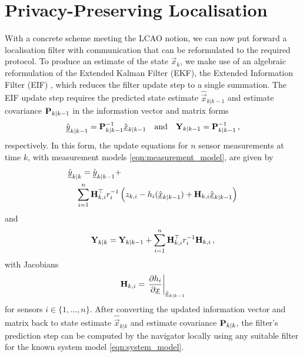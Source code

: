 \documentclass[10pt,letterpaper,oneside,twocolumn,journal]{IEEEtran}
\theoremstyle{definition}
\theoremstyle{definition}
\theoremstyle{remark}
\begin{document}
\section{Privacy-Preserving Localisation} \label{sec:priv_localisation}
With a concrete scheme meeting the LCAO notion, we can now put forward a localisation filter with communication that can be reformulated to the required protocol. To produce an estimate of the state $\vec{x}_k$, we make use of an algebraic reformulation of the Extended Kalman Filter (EKF), the Extended Information Filter (EIF) \cite{maybeckStochasticModelsEstimation1982}, which reduces the filter update step to a single summation. The EIF update step requires the predicted state estimate $\hat{\vec{x}}_{k|k-1}$ and estimate covariance ${{\mathbf{P}}}_{k|k-1}$ in the information vector and matrix forms
\begin{equation}
    \hat{{\underline{y}}}_{k|k-1} = {{\mathbf{P}}}_{k|k-1}^{-1}\hat{{\underline{x}}}_{k|k-1} \quad\textrm{and}\quad {\ensuremath{{\mathbf{Y}}}}_{k|k-1} = {{\mathbf{P}}}_{k|k-1}^{-1}\,,
\end{equation}
respectively. In this form, the update equations for $n$ sensor measurements at time $k$, with measurement models \eqref{eqn:measurement_model}, are given by
\begin{equation}
    \begin{split}
        &\hat{\vec{y}}_{k|k} = \hat{\vec{y}}_{k|k-1} + \\
        &\quad \sum^n_{i=1}\mat{H}^\top_{k,i} r^{-1}_i \left(z_{k,i} - h_i(\hat{\vec{x}}_{k|k-1}) + \mat{H}_{k,i}\hat{\vec{x}}_{k|k-1}\right)
    \end{split} \label{eqn:eif_info_vec_update}
\end{equation}
and
\begin{equation}
    \mat{Y}_{k|k} = \mat{Y}_{k|k-1} + \sum^n_{i=1}\mat{H}^\top_{k,i} r^{-1}_i \mat{H}_{k,i}\,, \label{eqn:eif_info_mat_update}
\end{equation}
with Jacobians
\begin{equation}
    \mat{H}_{k,i} = \left.\frac{\partial h_i}{\partial \vec{x}}\right|_{\hat{\vec{x}}_{k|k-1}} \label{eqn:measurement_jacobian}
\end{equation}
for sensors $i\in\{1,\dots,n\}$. After converting the updated information vector and matrix back to state estimate $\hat{\vec{x}}_{k|k}$ and estimate covariance ${{\mathbf{P}}}_{k|k}$, the filter's prediction step can be computed by the navigator locally using any suitable filter for the known system model \eqref{eqn:system_model}.
\end{document}
